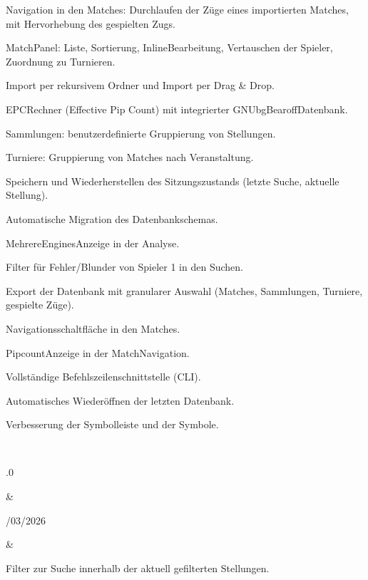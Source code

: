 \documentclass[letterpaper,10pt,german]{sphinxmanual}
\begin{document}
\begin{savenotes}
\begin{longtable}{}
\begin{varwidth}[t]{}
\sphinxAtStartPar
Navigation in den Matches: Durchlaufen der Züge eines importierten Matches, mit Hervorhebung des gespielten Zugs.

\sphinxAtStartPar
Match\sphinxhyphen{}Panel: Liste, Sortierung, Inline\sphinxhyphen{}Bearbeitung, Vertauschen der Spieler, Zuordnung zu Turnieren.

\sphinxAtStartPar
Import per rekursivem Ordner und Import per Drag \& Drop.

\sphinxAtStartPar
EPC\sphinxhyphen{}Rechner (Effective Pip Count) mit integrierter GNUbg\sphinxhyphen{}Bearoff\sphinxhyphen{}Datenbank.

\sphinxAtStartPar
Sammlungen: benutzerdefinierte Gruppierung von Stellungen.

\sphinxAtStartPar
Turniere: Gruppierung von Matches nach Veranstaltung.

\sphinxAtStartPar
Speichern und Wiederherstellen des Sitzungszustands (letzte Suche, aktuelle Stellung).

\sphinxAtStartPar
Automatische Migration des Datenbankschemas.

\sphinxAtStartPar
Mehrere\sphinxhyphen{}Engines\sphinxhyphen{}Anzeige in der Analyse.

\sphinxAtStartPar
Filter für Fehler/Blunder von Spieler 1 in den Suchen.

\sphinxAtStartPar
Export der Datenbank mit granularer Auswahl (Matches, Sammlungen, Turniere, gespielte Züge).

\sphinxAtStartPar
Navigationsschaltfläche in den Matches.

\sphinxAtStartPar
Pipcount\sphinxhyphen{}Anzeige in der Match\sphinxhyphen{}Navigation.

\sphinxAtStartPar
Vollständige Befehlszeilenschnittstelle (CLI).

\sphinxAtStartPar
Automatisches Wiederöffnen der letzten Datenbank.

\sphinxAtStartPar
Verbesserung der Symbolleiste und der Symbole.
\sphinxbeforeendvarwidth
\end{varwidth}%
\\
\sphinxhline\begin{varwidth}[t]{}
.0
\sphinxbeforeendvarwidth
\end{varwidth}%
&\begin{varwidth}[t]{}
/03/2026
\sphinxbeforeendvarwidth
\end{varwidth}%
&\begin{varwidth}[t]{}
\sphinxAtStartPar
Filter zur Suche innerhalb der aktuell gefilterten Stellungen.


\end{varwidth}
\end{longtable}
\end{savenotes}
\end{document}
